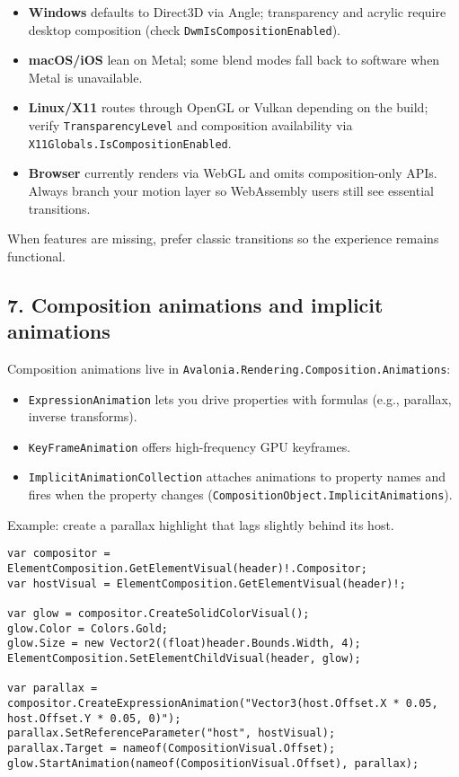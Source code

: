 \begin{itemize}
\tightlist
\item
  \textbf{Windows} defaults to Direct3D via Angle; transparency and
  acrylic require desktop composition (check
  \passthrough{\lstinline!DwmIsCompositionEnabled!}).
\item
  \textbf{macOS/iOS} lean on Metal; some blend modes fall back to
  software when Metal is unavailable.
\item
  \textbf{Linux/X11} routes through OpenGL or Vulkan depending on the
  build; verify \passthrough{\lstinline!TransparencyLevel!} and
  composition availability via
  \passthrough{\lstinline!X11Globals.IsCompositionEnabled!}.
\item
  \textbf{Browser} currently renders via WebGL and omits
  composition-only APIs. Always branch your motion layer so WebAssembly
  users still see essential transitions.
\end{itemize}

When features are missing, prefer classic transitions so the experience
remains functional.

\subsection{7. Composition animations and implicit
animations}\label{composition-animations-and-implicit-animations}

Composition animations live in
\passthrough{\lstinline!Avalonia.Rendering.Composition.Animations!}:

\begin{itemize}
\tightlist
\item
  \passthrough{\lstinline!ExpressionAnimation!} lets you drive
  properties with formulas (e.g., parallax, inverse transforms).
\item
  \passthrough{\lstinline!KeyFrameAnimation!} offers high-frequency GPU
  keyframes.
\item
  \passthrough{\lstinline!ImplicitAnimationCollection!} attaches
  animations to property names and fires when the property changes
  (\passthrough{\lstinline!CompositionObject.ImplicitAnimations!}).
\end{itemize}

Example: create a parallax highlight that lags slightly behind its host.

\begin{lstlisting}
var compositor = ElementComposition.GetElementVisual(header)!.Compositor;
var hostVisual = ElementComposition.GetElementVisual(header)!;

var glow = compositor.CreateSolidColorVisual();
glow.Color = Colors.Gold;
glow.Size = new Vector2((float)header.Bounds.Width, 4);
ElementComposition.SetElementChildVisual(header, glow);

var parallax = compositor.CreateExpressionAnimation("Vector3(host.Offset.X * 0.05, host.Offset.Y * 0.05, 0)");
parallax.SetReferenceParameter("host", hostVisual);
parallax.Target = nameof(CompositionVisual.Offset);
glow.StartAnimation(nameof(CompositionVisual.Offset), parallax);
\end{lstlisting}


